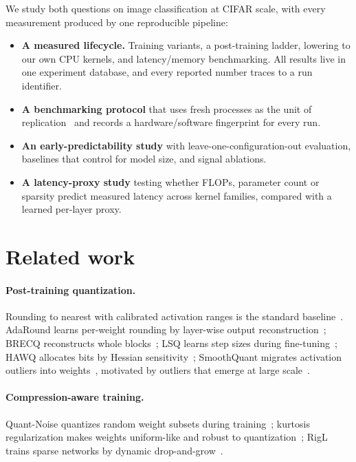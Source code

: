 \documentclass[10pt]{article}
\begin{document}
We study both questions on image classification at CIFAR scale, with every measurement
produced by one reproducible pipeline:
\begin{itemize}
  \item \textbf{A measured lifecycle.} Training variants, a post-training ladder, lowering to
  our own CPU kernels, and latency/memory benchmarking. All results live in one experiment
  database, and every reported number traces to a run identifier.
  \item \textbf{A benchmarking protocol} that uses fresh processes as the unit of
  replication~\citep{kalibera2013rigorous} and records a hardware/software fingerprint for
  every run.
  \item \textbf{An early-predictability study} with leave-one-configuration-out evaluation,
  baselines that control for model size, and signal ablations.
  \item \textbf{A latency-proxy study} testing whether FLOPs, parameter count or sparsity
  predict measured latency across kernel families, compared with a learned per-layer proxy.
\end{itemize}

\section{Related work}
\paragraph{Post-training quantization.} Rounding to nearest with calibrated activation
ranges is the standard baseline~\citep{krishnamoorthi2018,jacob2018quantization,nagel2021white}.
AdaRound learns per-weight rounding by layer-wise output reconstruction~\citep{nagel2020adaround};
BRECQ reconstructs whole blocks~\citep{li2021brecq}; LSQ learns step sizes during
fine-tuning~\citep{esser2020lsq}; HAWQ allocates bits by Hessian
sensitivity~\citep{dong2020hawqv2}; SmoothQuant migrates activation outliers into
weights~\citep{xiao2023smoothquant}, motivated by outliers that emerge at large
scale~\citep{dettmers2022llmint8}.
\paragraph{Compression-aware training.} Quant-Noise quantizes random weight subsets during
training~\citep{fan2021quantnoise}; kurtosis regularization makes weights uniform-like and
robust to quantization~\citep{shkolnik2020robust}; RigL trains sparse networks by dynamic
drop-and-grow~\citep{evci2020rigl}.
\end{document}

